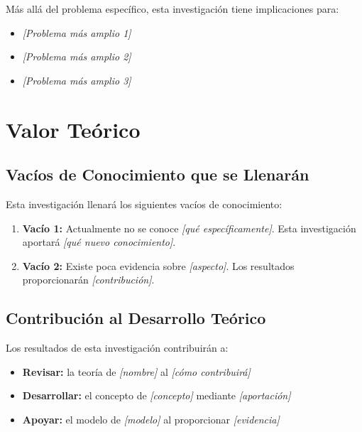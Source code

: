 Más allá del problema específico, esta investigación tiene implicaciones para:

\begin{itemize}
    \item \textit{[Problema más amplio 1]}
    \item \textit{[Problema más amplio 2]}
    \item \textit{[Problema más amplio 3]}
\end{itemize}

\section{Valor Teórico}
\label{sec:valor_teorico}


\subsection{Vacíos de Conocimiento que se Llenarán}

Esta investigación llenará los siguientes vacíos de conocimiento:

\begin{enumerate}
    \item \textbf{Vacío 1:} Actualmente no se conoce \textit{[qué específicamente]}. Esta investigación aportará \textit{[qué nuevo conocimiento]}.
    
    \item \textbf{Vacío 2:} Existe poca evidencia sobre \textit{[aspecto]}. Los resultados proporcionarán \textit{[contribución]}.
\end{enumerate}

\subsection{Contribución al Desarrollo Teórico}

Los resultados de esta investigación contribuirán a:

\begin{itemize}
    \item \textbf{Revisar:} la teoría de \textit{[nombre]} al \textit{[cómo contribuirá]}
    \item \textbf{Desarrollar:} el concepto de \textit{[concepto]} mediante \textit{[aportación]}
    \item \textbf{Apoyar:} el modelo de \textit{[modelo]} al proporcionar \textit{[evidencia]}
\end{itemize}

